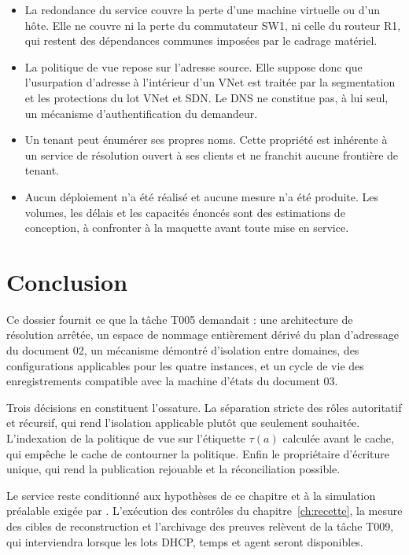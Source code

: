 \begin{itemize}
  \item La redondance du service couvre la perte d'une machine virtuelle ou
    d'un hôte. Elle ne couvre ni la perte du commutateur SW1, ni celle du
    routeur R1, qui restent des dépendances communes imposées par le cadrage
    matériel.
  \item La politique de vue repose sur l'adresse source. Elle suppose donc que
    l'usurpation d'adresse à l'intérieur d'un VNet est traitée par la
    segmentation et les protections du lot VNet et SDN. Le DNS ne constitue pas,
    à lui seul, un mécanisme d'authentification du demandeur.
  \item Un tenant peut énumérer ses propres noms. Cette propriété est inhérente
    à un service de résolution ouvert à ses clients et ne franchit aucune
    frontière de tenant.
  \item Aucun déploiement n'a été réalisé et aucune mesure n'a été produite. Les
    volumes, les délais et les capacités énoncés sont des estimations de
    conception, à confronter à la maquette avant toute mise en service.
\end{itemize}

\section*{Conclusion}

Ce dossier fournit ce que la tâche T005 demandait : une architecture de
résolution arrêtée, un espace de nommage entièrement dérivé du plan d'adressage
du document 02, un mécanisme démontré d'isolation entre domaines, des
configurations applicables pour les quatre instances, et un cycle de vie des
enregistrements compatible avec la machine d'états du document 03.

Trois décisions en constituent l'ossature. La séparation stricte des rôles
autoritatif et récursif, qui rend l'isolation applicable plutôt que seulement
souhaitée. L'indexation de la politique de vue sur l'étiquette $\tau(a)$
calculée avant le cache, qui empêche le cache de contourner la politique. Enfin
le propriétaire d'écriture unique, qui rend la publication rejouable et la
réconciliation possible.

Le service reste conditionné aux hypothèses de ce chapitre et à la simulation
préalable exigée par . L'exécution des contrôles du
chapitre~\ref{ch:recette}, la mesure des cibles de reconstruction et l'archivage
des preuves relèvent de la tâche T009, qui interviendra lorsque les lots DHCP,
temps et agent seront disponibles.
